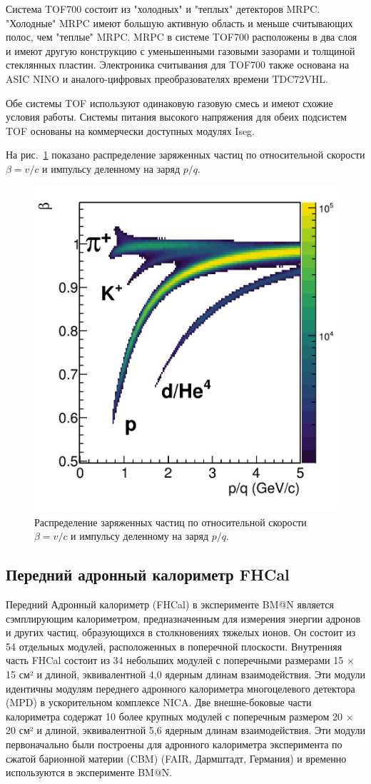Система TOF700 состоит из "холодных" и "теплых" детекторов MRPC. "Холодные" MRPC имеют большую активную область и меньше считывающих полос, чем "теплые" MRPC. 
MRPC в системе TOF700 расположены в два слоя и имеют другую конструкцию с уменьшенными газовыми зазорами и толщиной стеклянных пластин. 
Электроника считывания для TOF700 также основана на ASIC NINO и аналого-цифровых преобразователях времени TDC72VHL.

Обе системы TOF используют одинаковую газовую смесь и имеют схожие условия работы. 
Системы питания высокого напряжения для обеих подсистем TOF основаны на коммерчески доступных модулях Iseg.

На рис.~\ref{fig:bmn_beta_pq} показано распределение заряженных частиц по относительной скорости $\beta=v/c$ и импульсу деленному на заряд $p/q$.
%
\begin{figure}[ht]
\begin{center}
\includegraphics[width=0.55\linewidth]{images/beta_pq.png}
\caption{Распределение заряженных частиц по относительной скорости $\beta=v/c$ и импульсу деленному на заряд $p/q$.}
\label{fig:bmn_beta_pq}
\end{center}
\end{figure}

\subsection{Передний адронный калориметр FHCal}

Передний Адронный калориметр (FHCal) в эксперименте BM@N является сэмплирующим калориметром, предназначенным для измерения энергии адронов и других частиц, образующихся в столкновениях тяжелых ионов. 
Он состоит из 54 отдельных модулей, расположенных в поперечной плоскости. 
Внутренняя часть FHCal состоит из 34 небольших модулей с поперечными размерами 15 × 15 см² и длиной, эквивалентной 4,0 ядерным длинам взаимодействия. 
Эти модули идентичны модулям переднего адронного калориметра многоцелевого детектора (MPD) в ускорительном комплексе NICA. 
Две внешне-боковые части калориметра содержат 10 более крупных модулей с поперечным размером 20 × 20 см² и длиной, эквивалентной 5,6 ядерным длинам взаимодействия. 
Эти модули первоначально были построены для адронного калориметра эксперимента по сжатой барионной материи (CBM) (FAIR, Дармштадт, Германия) и временно используются в эксперименте BM@N.

